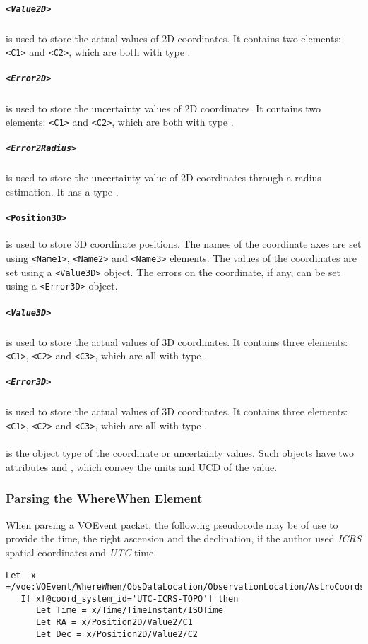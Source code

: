 \documentclass[11pt,a4paper]{ivoa}
\begin{document}
\subparagraph{\texttt{<Value2D>}} is used to store the actual values of 2D
coordinates. It contains two elements: \verb|<C1>| and \verb|<C2>|, which are
both with type .

\subparagraph{\texttt{<Error2D>}} is used to store the uncertainty values of 2D
coordinates. It contains two elements: \verb|<C1>| and \verb|<C2>|, which are
both with type .

\subparagraph{\texttt{<Error2Radius>}} is used to store the uncertainty value
of 2D coordinates through a radius estimation. It has a type .

\paragraph{\texttt{<Position3D>}} is used to store 3D coordinate positions. The
names of the coordinate axes are set using \verb|<Name1>|, \verb|<Name2>| and
\verb|<Name3>| elements. The values of the coordinates are set using a
\verb|<Value3D>| object. The errors on the coordinate, if any, can be set using
a \verb|<Error3D>| object.

\subparagraph{\texttt{<Value3D>}} is used to store the actual values of 3D
coordinates. It contains three elements: \verb|<C1>|, \verb|<C2>| and
\verb|<C3>|, which are all with type .

\subparagraph{\texttt{<Error3D>}} is used to store the actual values of 3D
coordinates. It contains three elements: \verb|<C1>|, \verb|<C2>| and
\verb|<C3>|, which are all with type .

\paragraph{} is the object type of the coordinate
or uncertainty values. Such objects have two attributes  and
, which convey the units and UCD of the value.

\subsubsection{Parsing the WhereWhen Element}
\label{sec:3.4.3}
When parsing a VOEvent packet, the following pseudocode may be of use to provide
the time, the right ascension and the declination, if the author used
\emph{ICRS} spatial coordinates and \emph{UTC} time.
\begin{lstlisting}
Let  x =/voe:VOEvent/WhereWhen/ObsDataLocation/ObservationLocation/AstroCoords
   If x[@coord_system_id='UTC-ICRS-TOPO'] then
      Let Time = x/Time/TimeInstant/ISOTime
      Let RA = x/Position2D/Value2/C1
      Let Dec = x/Position2D/Value2/C2
\end{lstlisting}
\end{document}
